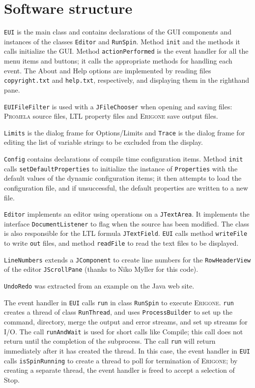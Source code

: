 \documentclass[11pt]{article}
\newcommand{\eri}{\textsc{Erigone}}
\newcommand{\prm}{\textsc{Promela}}
\newcommand{\p}[1]{\texttt{#1}}
\newcommand{\bu}[1]{\textsf{#1}}
\begin{document}
\newpage

\section{Software structure}

\p{EUI} is the main class and contains declarations
of the GUI components and instances
of the classes \p{Editor} and \p{RunSpin}.
Method \p{init} and the methods it calls initialize the GUI.
Method \p{action\-Per\-formed} is the event handler for all the menu items
and buttons; it calls the appropriate methods for handling each event.
The \bu{About} and \bu{Help} options are implemented by reading files
\p{copyright.txt} and \p{help.txt}, respectively, and displaying
them in the righthand pane.

\p{EUIFileFilter} is used with a \p{JFileChooser}
when opening and saving files: \prm{} source files,
LTL property files and \eri{} save output files.

\p{Limits} is the dialog frame for \bu{Options/Limits} and \p{Trace} is
the dialog frame for editing the list of variable strings to be excluded
from the display.

\p{Config} contains declarations of compile time configuration items.
Method \p{init} calls \p{set\-Default\-Properties} to initialize the instance
of \p{Properties} with the default values of the dynamic configuration
items; it then attempts to load the configuration file, and if unsuccessful,
the default properties are written to a new file.

\p{Editor} implements an editor using operations on a
\p{JTextArea}. It implements the interface \p{Document\-Listener} to flag
when the source has been modified. The class is also responsible
for the LTL formula \p{JTextField}. \p{EUI} calls method \p{writeFile}
to write \p{out} files, and method \p{readFile} to read
the text files to be displayed.

\p{LineNumbers} extends a \p{JComponent} to create line numbers
for the \p{RowHeaderView} of the editor \p{JScrollPane}
(thanks to Niko Myller for this code).

\p{UndoRedo} was extracted from an example on the Java web site.

The event handler in \p{EUI} calls \p{run} in class \p{RunSpin} to
execute \eri{}. \p{run} creates a thread of class \p{RunThread}, and
uses \p{ProcessBuilder} to set up the command, directory, merge the
output and error streams, and set up streams for I/O. The call
\p{runAndWait} is used for short calls like \bu{Compile}; this call does
not return until the completion of the subprocess. The call \p{run} will
return immediately after it has created the thread. In this case, the
event handler in \p{EUI} calls \p{isSpinRunning} to create a thread to
poll for termination of \eri{}; by creating a separate thread, the event
handler is freed to accept a selection of \bu{Stop}.
\end{document}
